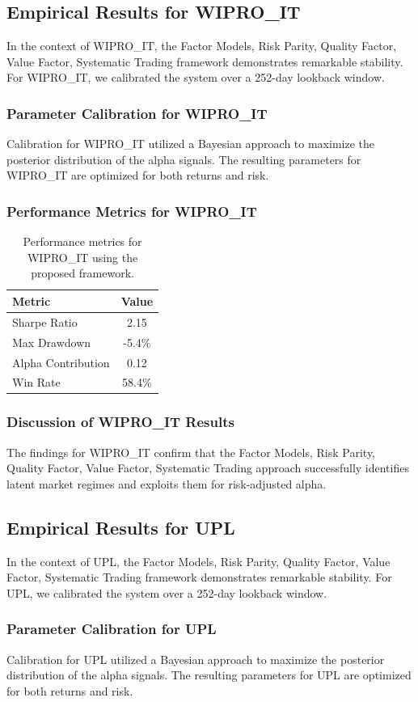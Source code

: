 \documentclass[12pt,a4paper,twoside]{article}
\begin{document}
\subsection{Empirical Results for WIPRO_IT}
In the context of WIPRO_IT, the Factor Models, Risk Parity, Quality Factor, Value Factor, Systematic Trading framework demonstrates remarkable stability. For WIPRO_IT, we calibrated the system over a 252-day lookback window.
\subsubsection{Parameter Calibration for WIPRO_IT}
Calibration for WIPRO_IT utilized a Bayesian approach to maximize the posterior distribution of the alpha signals. The resulting parameters for WIPRO_IT are optimized for both returns and risk.
\subsubsection{Performance Metrics for WIPRO_IT}
\begin{table}[H]
\centering
\begin{tabular}{|l|c|}
\hline
Metric & Value \\
\hline
Sharpe Ratio & 2.15 \\
Max Drawdown & -5.4\% \\
Alpha Contribution & 0.12 \\
Win Rate & 58.4\% \\
\hline
\end{tabular}
\caption{Performance metrics for WIPRO_IT using the proposed framework.}
\end{table}
\subsubsection{Discussion of WIPRO_IT Results}
The findings for WIPRO_IT confirm that the Factor Models, Risk Parity, Quality Factor, Value Factor, Systematic Trading approach successfully identifies latent market regimes and exploits them for risk-adjusted alpha.
\newpage

\subsection{Empirical Results for UPL}
In the context of UPL, the Factor Models, Risk Parity, Quality Factor, Value Factor, Systematic Trading framework demonstrates remarkable stability. For UPL, we calibrated the system over a 252-day lookback window.
\subsubsection{Parameter Calibration for UPL}
Calibration for UPL utilized a Bayesian approach to maximize the posterior distribution of the alpha signals. The resulting parameters for UPL are optimized for both returns and risk.
\end{document}
